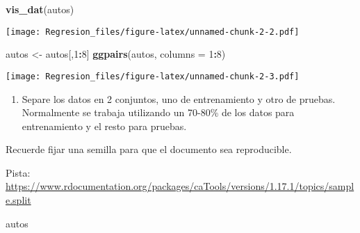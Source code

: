 \documentclass[]{article}
\newenvironment{Shaded}{\begin{snugshade}}{\end{snugshade}}
\newcommand{\DataTypeTok}[1]{\textcolor[rgb]{0.13,0.29,0.53}{#1}}
\newcommand{\DecValTok}[1]{\textcolor[rgb]{0.00,0.00,0.81}{#1}}
\newcommand{\KeywordTok}[1]{\textcolor[rgb]{0.13,0.29,0.53}{\textbf{#1}}}
\newcommand{\NormalTok}[1]{#1}
\newcommand{\OperatorTok}[1]{\textcolor[rgb]{0.81,0.36,0.00}{\textbf{#1}}}
\newcommand{\StringTok}[1]{\textcolor[rgb]{0.31,0.60,0.02}{#1}}
\providecommand{\tightlist}{%
  \setlength{\itemsep}{0pt}\setlength{\parskip}{0pt}}
\begin{document}
\begin{Shaded}
\begin{Highlighting}[]
\KeywordTok{vis_dat}\NormalTok{(autos)}
\end{Highlighting}
\end{Shaded}

\texttt{[image: Regresion\_files/figure-latex/unnamed-chunk-2-2.pdf]}

\begin{Shaded}
\begin{Highlighting}[]
\NormalTok{autos <-}\StringTok{ }\NormalTok{autos[,}\DecValTok{1}\OperatorTok{:}\DecValTok{8}\NormalTok{]}
\KeywordTok{ggpairs}\NormalTok{(autos, }\DataTypeTok{columns =} \DecValTok{1}\OperatorTok{:}\DecValTok{8}\NormalTok{)}
\end{Highlighting}
\end{Shaded}

\texttt{[image: Regresion\_files/figure-latex/unnamed-chunk-2-3.pdf]}

\begin{enumerate}
\def\labelenumi{\arabic{enumi}.}
\setcounter{enumi}{2}
\tightlist
\item
  Separe los datos en 2 conjuntos, uno de entrenamiento y otro de
  pruebas. Normalmente se trabaja utilizando un 70-80\% de los datos
  para entrenamiento y el resto para pruebas.
\end{enumerate}

Recuerde fijar una semilla para que el documento sea reproducible.

Pista:
\url{https://www.rdocumentation.org/packages/caTools/versions/1.17.1/topics/sample.split}

\begin{Shaded}
\begin{Highlighting}[]
\NormalTok{autos}
\end{Highlighting}
\end{Shaded}
\end{document}
